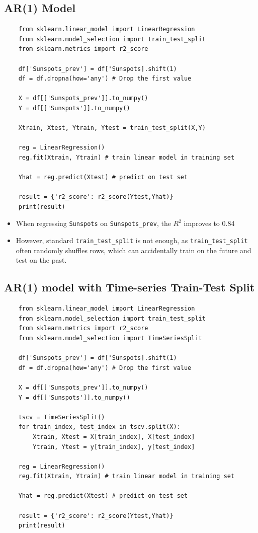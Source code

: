\documentclass{article}
\begin{document}
\subsection{AR(1) Model}
\begin{verbatim}
    from sklearn.linear_model import LinearRegression
    from sklearn.model_selection import train_test_split
    from sklearn.metrics import r2_score

    df['Sunspots_prev'] = df['Sunspots].shift(1)
    df = df.dropna(how='any') # Drop the first value

    X = df[['Sunspots_prev']].to_numpy()
    Y = df[['Sunspots']].to_numpy()

    Xtrain, Xtest, Ytrain, Ytest = train_test_split(X,Y)

    reg = LinearRegression()
    reg.fit(Xtrain, Ytrain) # train linear model in training set

    Yhat = reg.predict(Xtest) # predict on test set

    result = {'r2_score': r2_score(Ytest,Yhat)}
    print(result)
\end{verbatim}
\begin{itemize}
    \item When regressing \texttt{Sunspots} on \texttt{Sunspots\_prev}, the $R^2$ improves to 0.84
\end{itemize}

\begin{itemize}
    \item However, standard \texttt{train\_test\_split} is not enough, as \texttt{train\_test\_split} often randomly shuffles rows, which can accidentally train on the future and test on the past.
\end{itemize}
\subsection{AR(1) model with Time-series Train-Test Split}
\begin{verbatim}
    from sklearn.linear_model import LinearRegression
    from sklearn.model_selection import train_test_split
    from sklearn.metrics import r2_score
    from sklearn.model_selection import TimeSeriesSplit
    
    df['Sunspots_prev'] = df['Sunspots].shift(1)
    df = df.dropna(how='any') # Drop the first value

    X = df[['Sunspots_prev']].to_numpy()
    Y = df[['Sunspots']].to_numpy()

    tscv = TimeSeriesSplit()
    for train_index, test_index in tscv.split(X):
        Xtrain, Xtest = X[train_index], X[test_index]
        Ytrain, Ytest = y[train_index], y[test_index]

    reg = LinearRegression()
    reg.fit(Xtrain, Ytrain) # train linear model in training set

    Yhat = reg.predict(Xtest) # predict on test set

    result = {'r2_score': r2_score(Ytest,Yhat)}
    print(result)
\end{verbatim}
\end{document}
